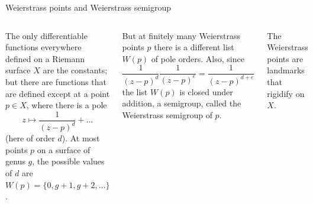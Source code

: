 \documentclass[11pt, aspectratio=43]{beamer}
\begin{document}
\begin{frame}{Weierstrass points and Weierstrass semigroup}
\begin{columns}
 The only differentiable functions
 everywhere defined on a Riemann surface $X$ are the constants;
 but there are functions that are defined except
 at a point $p\in X$, where there is a pole 
 $$
 z\mapsto \frac{1}{(z-p)^d} + \dots
 $$
 (here of order $d$). At most points $p$ on a surface of
 genus $g$, the possible values of $d$ are
$W(p) = \{0, g+1,g+2,\dots\}$.

But at finitely many \alert{Weierstrass points} $p$
there is a different list $W(p)$ of pole orders. Also, since
$$
\frac{1}{(z-p)^d}\frac{1}{(z-p)^e} = \frac{1}{(z-p)^{d+e}}
$$
the list $W(p)$ is closed under addition, a \alert{semigroup},
called the \alert{Weierstrass semigroup} of $p$.

\bigskip

The Weierstrass points are landmarks that rigidify on $X$.
\end{columns}
 
\end{frame}
\end{document}
